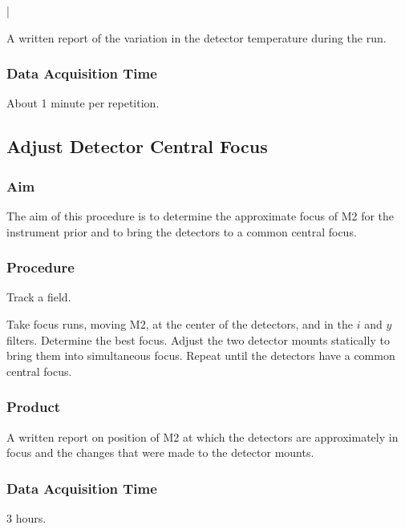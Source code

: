 |\documentclass{article}
\begin{document}
A written report of the variation in the detector temperature during the run.

\subsubsection{Data Acquisition Time}

About 1 minute per repetition.


\subsection{Adjust Detector Central Focus}

\subsubsection{Aim}

The aim of this procedure is to determine the approximate focus of M2 for the instrument prior and to bring the detectors to a common central focus.

\subsubsection{Procedure}

Track a field. 

Take focus runs, moving M2, at the center of the detectors, and in the $i$ and $y$ filters. Determine the best focus. Adjust the two detector mounts statically to bring them into simultaneous focus. Repeat until the detectors have a common central focus.

\subsubsection{Product}

A written report on position of M2 at which the detectors are approximately in focus and the changes that were made to the detector mounts.

\subsubsection{Data Acquisition Time}

3 hours.

\end{document}
